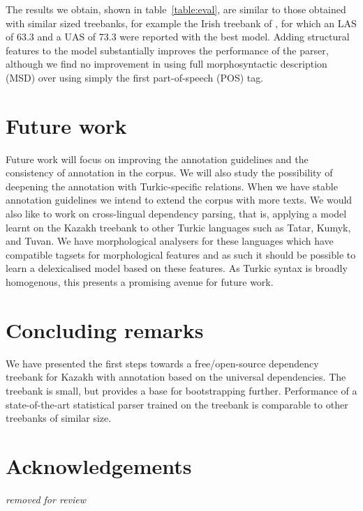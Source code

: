 \documentclass[a4paper,11pt, onecolumn,twoside]{article}
\begin{document}
The results we obtain, shown in table~\ref{table:eval}, are similar to those obtained with similar 
sized treebanks, for example the Irish treebank of \textcite{Lynn12}, for which an LAS of
63.3 and a UAS of 73.3 were reported with the best model.  Adding structural features to the model substantially improves the performance of the parser, although we find no improvement in using full morphosyntactic description (MSD) over using simply the first part-of-speech (POS) tag.


\section{Future work}\label{sec:future}




Future work will focus on improving the annotation guidelines and the consistency of
annotation in the corpus. We will also study the possibility of deepening the annotation
with Turkic-specific relations. When we have stable annotation guidelines we intend to 
extend the corpus with more texts.
We would also like to work on cross-lingual dependency parsing,
that is, applying a model learnt on the Kazakh treebank to other Turkic languages
such as Tatar, Kumyk, and Tuvan. We have morphological analysers for these languages which have
compatible tagsets for morphological features and as such it should be possible to learn a
delexicalised model based on these features. As Turkic syntax is broadly homogenous, this
presents a promising avenue for future work.


\section{Concluding remarks}\label{sec:conclusions}

We have presented the first steps towards a free/open-source dependency treebank for
Kazakh with annotation based on the universal dependencies. The treebank is small, but
provides a base for bootstrapping further. Performance of a state-of-the-art statistical
parser trained on the treebank is comparable to other treebanks of similar size.

\section*{Acknowledgements}

\emph{removed for review}


%
%
\begin{small}
\printbibliography
\end{small}
\end{document}
